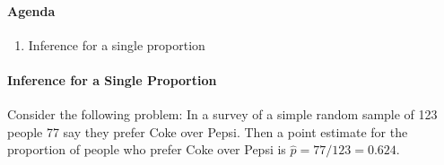 \documentclass[10pt]{article}\usepackage[]{graphicx}\usepackage[]{color}
\newcommand{\Ex}{\mathbb{E}}
\begin{document}
\paragraph{Agenda}
\begin{enumerate}
  \itemsep0em
  \item Inference for a single proportion
\end{enumerate}




% 
% 
%   


\paragraph{Inference for a Single Proportion}

% 

Consider the following problem: In a survey of a simple random sample of 123 people 77 say they prefer Coke over Pepsi. Then a point estimate for the proportion of people who prefer Coke over Pepsi is $\hat{p} =77/123 = 0.624$.
\end{document}
